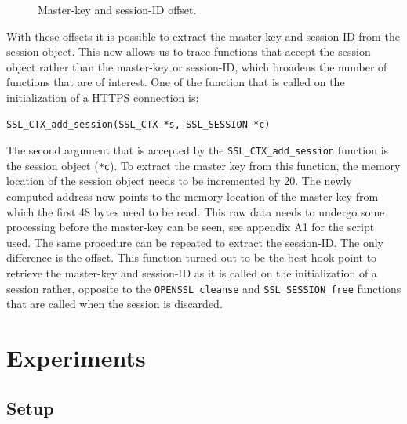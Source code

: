 \documentclass[12pt, a4paper]{report}
\begin{document}
\begin{figure}[!h]
\centering
{}
\caption{Master-key and session-ID offset.}
\end{figure}
\noindent With these offsets it is possible to extract the master-key and session-ID from the session object. This now allows us to trace functions that accept the session object rather than the master-key or session-ID, which broadens the number of functions that are of interest. 
\newline
\newline
One of the function that is called on the initialization of a HTTPS connection is:
\begin{lstlisting}[frame=single, breaklines=true]
SSL_CTX_add_session(SSL_CTX *s, SSL_SESSION *c)
\end{lstlisting}
The second argument that is accepted by the \texttt{SSL\_CTX\_add\_session} function is the session object (\texttt{*c}). To extract the master key from this function, the memory location of the session object needs to be incremented by 20. The newly computed address now points to the memory location of the master-key from which the first 48 bytes need to be read. This raw data needs to undergo some processing before the master-key can be seen, see appendix A1 for the script used. The same procedure can be repeated to extract the session-ID. The only difference is the offset. 
This function turned out to be the best hook point to retrieve the master-key and session-ID as it is called on the initialization of a session rather, opposite to the \texttt{OPENSSL\_cleanse} and \texttt{SSL\_SESSION\_free} functions that are called when the session is discarded.

\chapter{Experiments}
\section{Setup}
\end{document}
